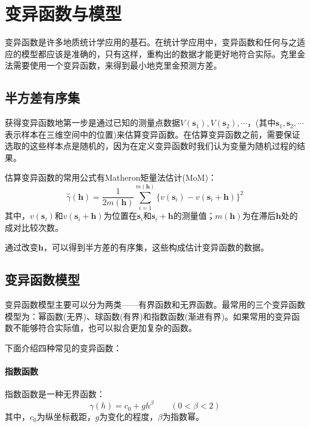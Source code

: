 \section{变异函数与模型}
变异函数是许多地质统计学应用的基石。在统计学应用中，变异函数和任何与之适应的模型都应该是准确的，只有这样，重构出的数据才能更好地符合实际。克里金法需要使用一个变异函数，来得到最小地克里金预测方差。

\subsection{半方差有序集}
获得变异函数地第一步是通过已知的测量点数据$ V\left( \mathbf{s}_{1} \right) , V\left( \mathbf{s}_{2} \right) , \cdots $，(其中$ \mathbf{s}_{1} , \mathbf{s}_{2} , \cdots $表示样本在三维空间中的位置)来估算变异函数。在估算变异函数之前，需要保证选取的这些样本点是随机的，因为在定义变异函数时我们认为变量为随机过程的结果。

估算变异函数的常用公式有Matheron矩量法估计(MoM)：
\begin{equation}
    \hat{\gamma}\left( \mathbf{h} \right) = \frac{1}{2m\left( \mathbf{h} \right)} \sum_{i=1}^{m\left( \mathbf{h} \right)} \{v\left( \mathbf{s}_{i} \right) - v\left( \mathbf{s}_{i} + \mathbf{h} \right)\}^{2}
    \label{Matheron矩量法估计}
\end{equation}
其中，$ v\left( \mathbf{s}_{i} \right) $和$ v\left( \mathbf{s}_{i} + \mathbf{h} \right) $为位置在$ \mathbf{s}_{i} $和$ \mathbf{s}_{i} + \mathbf{h} $的测量值；$ m\left( \mathbf{h} \right) $为在滞后$ \mathbf{h} $处的成对比较次数。

通过改变$ \mathbf{h} $，可以得到半方差的有序集，这些构成估计变异函数的数据。

\subsection{变异函数模型}
变异函数模型主要可以分为两类——有界函数和无界函数。最常用的三个变异函数模型为：幂函数(无界)、球函数(有界)和指数函数(渐进有界)。如果常用的变异函数不能够符合实际值，也可以拟合更加复杂的函数。

下面介绍四种常见的变异函数：
\paragraph{指数函数}
指数函数是一种无界函数：
\begin{equation}
    \gamma\left( h \right) = c_{0} + g h^{\beta} \qquad \left( 0 < \beta < 2 \right)
\end{equation}
其中，$ c_{0} $为纵坐标截距，$ g $为变化的程度，$ \beta $为指数幂。
